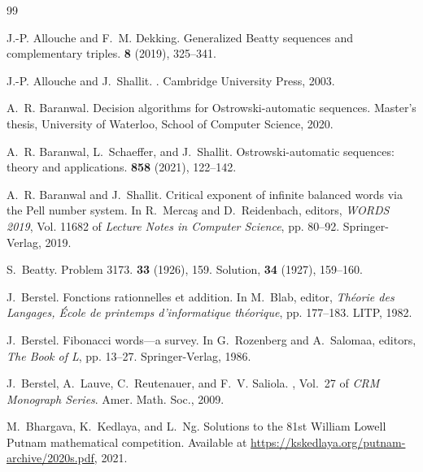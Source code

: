\documentclass[12pt,reqno]{article}
\begin{document}
\begin{thebibliography}{99}

J.-P. Allouche and F.~M. Dekking.
\newblock Generalized {Beatty} sequences and complementary triples.
 {\bf 8} (2019),
  325--341.

J.-P. Allouche and J.~Shallit.
.
\newblock Cambridge University Press, 2003.

A.~R. Baranwal.
\newblock Decision algorithms for {Ostrowski-automatic} sequences.
\newblock Master's thesis, University of Waterloo, School of Computer Science,
  2020.

A.~R. Baranwal, L.~Schaeffer, and J.~Shallit.
\newblock Ostrowski-automatic sequences: theory and applications.
 {\bf 858} (2021), 122--142.

A.~R. Baranwal and J.~Shallit.
\newblock Critical exponent of infinite balanced words via the {Pell} number
  system.
\newblock In R.~{Merca\c{s}} and D.~Reidenbach, editors, {\em WORDS 2019}, Vol.
  11682 of {\em Lecture Notes in Computer Science}, pp.  80--92.
  Springer-Verlag, 2019.

S.~Beatty.
\newblock Problem 3173.
 {\bf 33} (1926), 159.
\newblock Solution, {\bf 34} (1927), 159--160.

J.~Berstel.
\newblock Fonctions rationnelles et addition.
\newblock In M.~Blab, editor, {\em Th\'eorie des Langages, \'Ecole de printemps
  d'informatique th\'eorique}, pp.  177--183. LITP, 1982.

J.~Berstel.
\newblock Fibonacci words---a survey.
\newblock In G.~Rozenberg and A.~Salomaa, editors, {\em The Book of L}, pp.
  13--27. Springer-Verlag, 1986.

J.~Berstel, A.~Lauve, C.~Reutenauer, and F.~V. Saliola.
, Vol.~27 of {\em CRM Monograph Series}.
\newblock Amer. Math. Soc., 2009.

M.~Bhargava, K.~Kedlaya, and L.~Ng.
\newblock Solutions to the 81st {William Lowell Putnam} mathematical
  competition.
\newblock Available at \url{https://kskedlaya.org/putnam-archive/2020s.pdf},
  2021.


\end{thebibliography}
\end{document}
